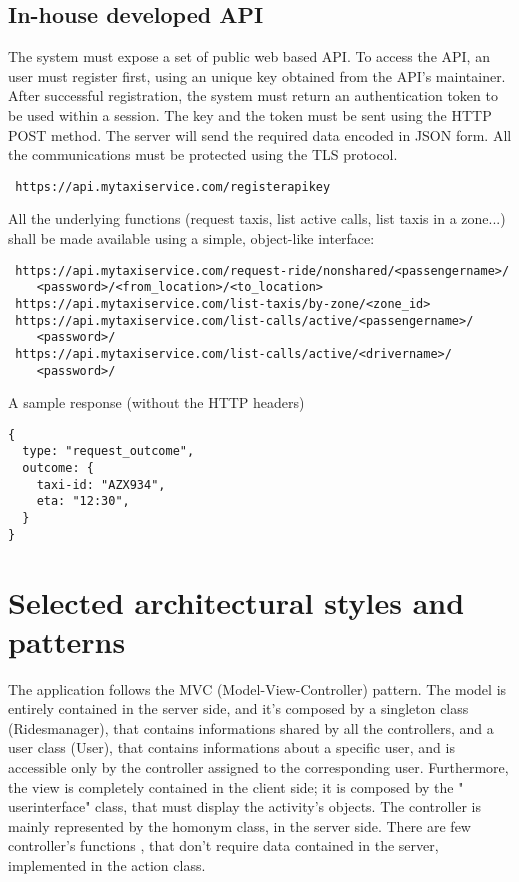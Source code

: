 \subsection{In-house developed API}
The system must expose a set of public web based API. To access the API, an user must register first, using an unique key
obtained from the API's maintainer.
After successful registration, the system must return an authentication token to be used within a session.
The key and the token must be sent using the HTTP POST method.
The server will send the required data encoded in JSON form.
All the communications must be protected using the TLS protocol.
\begin{verbatim}
 https://api.mytaxiservice.com/registerapikey
\end{verbatim}
All the underlying functions (request taxis, list active calls, list taxis in a zone...) shall be made available using a simple,
object-like interface:
\begin{verbatim}
 https://api.mytaxiservice.com/request-ride/nonshared/<passengername>/
    <password>/<from_location>/<to_location>
 https://api.mytaxiservice.com/list-taxis/by-zone/<zone_id>
 https://api.mytaxiservice.com/list-calls/active/<passengername>/
    <password>/
 https://api.mytaxiservice.com/list-calls/active/<drivername>/
    <password>/
\end{verbatim}
A sample response (without the HTTP headers)
\begin{verbatim}
{
  type: "request_outcome",
  outcome: {
    taxi-id: "AZX934",
    eta: "12:30",
  }
}
\end{verbatim}

\section{Selected architectural styles and patterns}
The application follows the MVC (Model-View-Controller) pattern.
The model is entirely contained in the server side, and it's composed by a singleton class (Ridesmanager), that contains 
informations shared by all the controllers, and a user class (User), that contains informations about a specific user, and is
accessible only by the controller assigned to the corresponding user.
Furthermore, the view is completely contained in the client side; it is composed by the " userinterface" class, that must display
the activity's objects.
The controller is mainly represented by the homonym class, in the server side. There are few controller's functions , that don't 
require data contained in the server, implemented in the action class.

